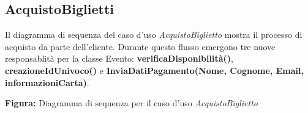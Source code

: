 \newpage
{
\subsection{AcquistoBiglietti}

\begin{center}
Il diagramma di sequenza del caso d’uso \textit{AcquistoBiglietto} mostra il processo di acquisto da parte dell’cliente. Durante questo flusso emergono tre nuove responsablità per la classe Evento: \textbf{verificaDisponibilità()}, \textbf{creazioneIdUnivoco()} e \textbf{InviaDatiPagamento(Nome, Cognome, Email, informazioniCarta)}.
\vspace*{2mm}

\vspace{1ex}
\textbf{Figura:} Diagramma di sequenza per il caso d’uso \textit{AcquistoBiglietto}
\end{center}
}

\vspace{2ex}

